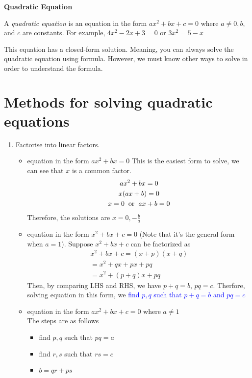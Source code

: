 \documentclass[11pt]{article}
\begin{document}
\begin{center}
    \textbf{\huge Quadratic Equation}
\end{center}
A \emph{quadratic equation} is an equation in the form  $ax^2+bx+c=0$ where $a\neq 0,b,$ and $c$ are constants. For example,  $4x^2-2x+3=0$ or $3x^2=5-x$

This equation has a closed-form solution. Meaning, you can always solve the quadratic equation using formula. However, we must know other ways to solve in order to understand the formula. 
\section{Methods for solving quadratic equations}
\begin{enumerate}
    \item Factorise into linear factors.
    \begin{itemize}
        \item equation in the form  $ax^2+bx=0$
        This is the easiest form to solve, we can see that $x$ is a common factor. 
        \begin{gather*}
            ax^2+bx=0
            \\x(ax+b)=0
            \\x=0 \hspace{2mm} \text{or} \hspace{2mm} ax+b=0
        \end{gather*}
        Therefore, the solutions are $x=0,-\frac{b}{a}$
        \vspace{5mm}
        \item equation in the form $x^2+bx+c=0$ (Note that it's the general form when $a=1$).
        Suppose $x^2+bx+c$ can be factorized as
        \begin{align*}
            x^2+bx+c=(x+p)(x+q)
            \\ = x^2+qx+px+pq
            \\ = x^2+(p+q)x+pq
        \end{align*}
        Then, by comparing LHS and RHS, we have $p+q=b$, $pq=c$. Therfore, solving equation in this form, we \textcolor{blue}{find $p,q$ such that $p+q=b$ and $pq=c$} 
        \vspace{5mm}
        \item equation in the form $ax^2+bx+c=0$ where $a\neq 1$ \\
        The steps are as follows
        \begin{itemize}
        \renewcommand\labelitemii{$\rightarrow$}
            \item find $p,q$ such that $pq = a$
            \item find $r,s$ such that $rs = c$
            \item $b = qr+ps$
            

\end{itemize}
\end{itemize}
\end{enumerate}
\end{document}
